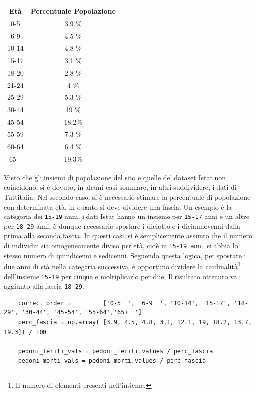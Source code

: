 \documentclass[a4paper,12pt]{report}
\newcommand{\columnstyle}[1]{\texttt{#1}}
\begin{document}
\begin{center}
    \def\arraystretch{1.5}%
    \begin{tabular}{ |c|c| } 
    \hline
    Età & Percentuale Popolazione \\ 
    \hline
    \rowcolor{TableGray}
    0-5     & 3.9 \% \\ 
    6-9     & 4.5 \% \\
    \rowcolor{TableGray}
    10-14   & 4.8 \% \\
    15-17   & 3.1 \% \\
    \rowcolor{TableGray}
    18-20   & 2.8 \% \\ 
    21-24   & 4   \% \\
    \rowcolor{TableGray}
    25-29   & 5.3 \% \\
    30-44   & 19  \% \\
    \rowcolor{TableGray}
    45-54   & 18.2\% \\ 
    55-59   & 7.3 \% \\
    \rowcolor{TableGray}
    60-64   & 6.4 \% \\
    65$+$   & 19.3\% \\
    \hline
    \end{tabular}
\end{center}

Visto che gli insiemi di popolazione del sito e quelle del dataset Istat non coincidono, 
si è dovuto, in alcuni casi sommare, in altri suddividere, i dati di Tuttitalia.
Nel secondo caso, si è necessario stimare la percentuale di popolazione con 
determinata età, in quanto si deve dividere una fascia.
Un esempio è la categoria dei \columnstyle{15-19} anni, 
i dati Istat hanno un insieme per \columnstyle{15-17} anni e un altro per 
\columnstyle{18-29} anni, 
è dunque necessario spostare i diciotto e i diciannovenni dalla prima alla 
seconda fascia. 
In questi casi, si è semplicemente assunto che il numero di individui sia omogeneamente 
diviso per età, cioè in \columnstyle{15-19 anni} si abbia lo stesso numero di 
quindicenni e sedicenni.
Seguendo questa logica, per spostare i due anni di età nella categoria successiva, 
è opportuno dividere la cardinalità\footnote{Il numero di elementi presenti nell'insieme.} 
dell'insieme \columnstyle{15-19} per cinque e moltiplicarlo per due. 
Il risultato ottenuto va aggiunto alla fascia \columnstyle{18-29}.

\begin{lstlisting}
    correct_order =         ['0-5  ', '6-9  ', '10-14', '15-17', '18-29', '30-44', '45-54', '55-64','65+  ']
    perc_fascia = np.array( [3.9, 4.5, 4.8, 3.1, 12.1, 19, 18.2, 13.7, 19.3]) / 100

    pedoni_feriti_vals = pedoni_feriti.values / perc_fascia
    pedoni_morti_vals = pedoni_morti.values / perc_fascia
\end{lstlisting}
\end{document}
